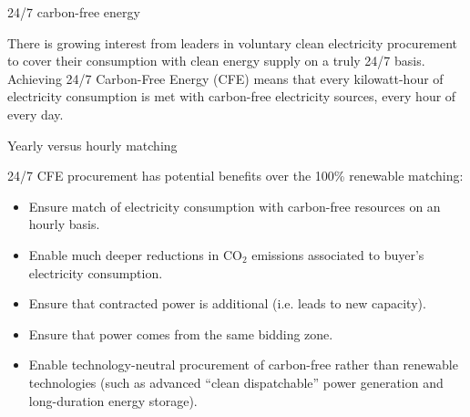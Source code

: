 \begin{frame}{24/7 carbon-free energy}

  \centering

  There is growing interest from leaders in voluntary clean
  electricity procurement to cover their consumption 
  with clean energy supply on a \alert{truly 24/7 basis}. \\
  \vspace{0.3cm}
  Achieving 24/7 Carbon-Free Energy (CFE) means that every kilowatt-hour of electricity consumption is met
  with carbon-free electricity sources, \alert{every hour of every day}.
  
\end{frame}



\begin{frame}{Yearly versus hourly matching}
  
  24/7 CFE procurement has potential benefits over the 100\% renewable matching:
  
  \begin{itemize}
  \item Ensure match of electricity consumption with carbon-free resources 
        on an \alert{hourly basis}.
  \item Enable much \alert{deeper reductions in CO$_2$ emissions} associated 
        to buyer's electricity consumption.
  \item Ensure that contracted power is \alert{additional} (i.e. leads to new capacity).
  \item Ensure that power comes from the \alert{same bidding zone}.
  \item Enable technology-neutral procurement of \alert{carbon-free} rather than renewable technologies 
        (such as advanced “clean dispatchable” power generation and long-duration energy storage).
  \end{itemize}
  
\end{frame}



